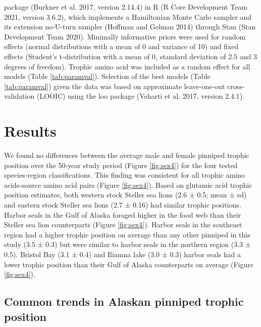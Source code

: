 \documentclass [11pt, proquest] {uwthesis}[2015/03/03]
\begin{document}
package (Burkner et al. 2017, version 2.14.4) in R (R Core Development
Team 2021, version 3.6.2), which implements a Hamiltonian Monte Carlo
sampler and its extension no-U-turn sampler (Hoffman and Gelman 2014)
through Stan (Stan Development Team 2020). Minimally informative priors
were used for random effects (normal distributions with a mean of 0 and
variance of 10) and fixed effects (Student's t-distribution with a mean
of 0, standard deviation of 2.5 and 3 degrees of freedom). Trophic amino
acid was included as a random effect for all models (Table
\ref{tab:paramval}). Selection of the best models (Table
\ref{tab:paramval}) given the data was based on approximate
leave-one-out cross-validation (LOOIC) using the loo package (Veharti et
al. 2017, version 2.4.1).

\section{Results}\label{results-3}

We found no differences between the average male and female pinniped
trophic position over the 50-year study period (Figure \ref{fig:sex4})
for the four tested species-region classifications. This finding was
consistent for all trophic amino acids-source amino acid pairs (Figure
\ref{fig:sex4}). Based on glutamic acid trophic position estimates, both
western stock Steller sea lions (2.6 ± 0.5; mean ± sd) and eastern stock
Steller sea lions (2.7 ± 0.16) had similar trophic positions. Harbor
seals in the Gulf of Alaska foraged higher in the food web than their
Steller sea lion counterparts (Figure \ref{fig:sex4}). Harbor seals in
the southeast region had a higher trophic position on average than any
other pinniped in this study (3.5 ± 0.3) but were similar to harbor
seals in the northern region (3.3 ± 0.5). Bristol Bay (3.1 ± 0.4) and
Iliamna lake (3.0 ± 0.3) harbor seals had a lower trophic position than
their Gulf of Alaska counterparts on average (Figure \ref{fig:sex4}).

\subsection{Common trends in Alaskan pinniped trophic
position}\label{common-trends-in-alaskan-pinniped-trophic-position}
\end{document}
